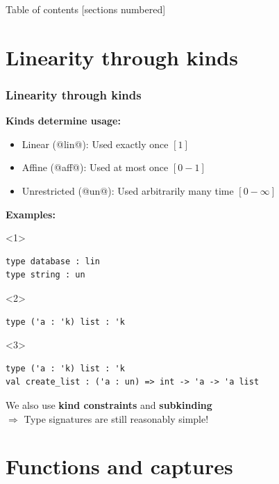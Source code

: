 \documentclass[aspectratio=169,dvipsnames,svgnames,10pt]{beamer}
\begin{document}
\begin{frame}{Table of contents}
  [sections numbered]
  \tableofcontents[hideallsubsections]
\end{frame}

\section{Linearity through kinds}

\begin{frame}[fragile]
  \frametitle{Linearity through kinds}
  
  \textbf{Kinds determine usage:}
  \begin{itemize}
  \item Linear (@lin@): Used exactly once $[1]$
  \item Affine (@aff@): Used at most once $[0-1]$
  \item Unrestricted (@un@): Used arbitrarily many time $[0-\infty]$
  \end{itemize}

  \textbf{Examples:}
  \begin{onlyenv}<1>
\begin{verbatim}
type database : lin
type string : un
\end{verbatim}
  \end{onlyenv}
  \begin{onlyenv}<2>
\begin{verbatim}
type ('a : 'k) list : 'k
\end{verbatim}
  \end{onlyenv}
  \begin{onlyenv}<3>
\begin{verbatim}
type ('a : 'k) list : 'k
val create_list : ('a : un) => int -> 'a -> 'a list
\end{verbatim}

    We also use \textbf{kind constraints} and \textbf{subkinding}\\
    $\Rightarrow$ Type signatures are still reasonably simple!
  \end{onlyenv}
\end{frame}


\section{Functions and captures}
\end{document}
